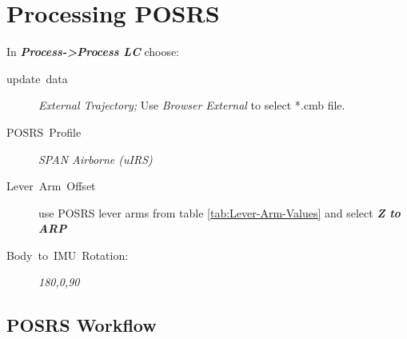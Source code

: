 \documentclass[british]{book}
\begin{document}
\section{Processing POSRS\label{sub:Processing-POSRS}}

In \textbf{\emph{Process->Process LC}} choose:
\begin{description}
	\item [{update~data}] \emph{External Trajectory; }Use \emph{Browser External} to select {*}.cmb file.
	\item [{POSRS~Profile}] \emph{SPAN Airborne (uIRS)}
	\item [{Lever~Arm~Offset}] use POSRS lever arms from table \ref{tab:Lever-Arm-Values} and select \textbf{\emph{Z to ARP}}
	\item [{Body~to~IMU~Rotation:}] \emph{180,0,90 }
	\end{description}
	
\subsection{POSRS Workflow\label{sub:POSRS-Workflow}}
\end{document}
